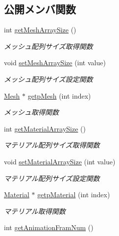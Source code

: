 \subsection*{公開メンバ関数}
\begin{DoxyCompactItemize}
\item 
int \mbox{\hyperlink{class_md_bin_data_a6aa476ad1bb36532609cf344d68a53d8}{get\+Mesh\+Array\+Size}} ()
\begin{DoxyCompactList}\small\item\em メッシュ配列サイズ取得関数 \end{DoxyCompactList}\item 
void \mbox{\hyperlink{class_md_bin_data_aa0e9c2a5db151909fbbf0c3ef41c4e25}{set\+Mesh\+Array\+Size}} (int value)
\begin{DoxyCompactList}\small\item\em メッシュ配列サイズ設定関数 \end{DoxyCompactList}\item 
\mbox{\hyperlink{class_md_bin_data_1_1_mesh}{Mesh}} $\ast$ \mbox{\hyperlink{class_md_bin_data_a8a5dfdabb48917851cea4faa7faf4e35}{getp\+Mesh}} (int index)
\begin{DoxyCompactList}\small\item\em メッシュ取得関数 \end{DoxyCompactList}\item 
int \mbox{\hyperlink{class_md_bin_data_aabed66d8e767c03ad946280048faf226}{get\+Material\+Array\+Size}} ()
\begin{DoxyCompactList}\small\item\em マテリアル配列サイズ取得関数 \end{DoxyCompactList}\item 
void \mbox{\hyperlink{class_md_bin_data_afe92da8866475459da756ecfb92e2683}{set\+Material\+Array\+Size}} (int value)
\begin{DoxyCompactList}\small\item\em マテリアル配列サイズ設定関数 \end{DoxyCompactList}\item 
\mbox{\hyperlink{class_md_bin_data_1_1_material}{Material}} $\ast$ \mbox{\hyperlink{class_md_bin_data_a10bca66286683a1031fc64307866270a}{getp\+Material}} (int index)
\begin{DoxyCompactList}\small\item\em マテリアル取得関数 \end{DoxyCompactList}\item 
int \mbox{\hyperlink{class_md_bin_data_a07857df021c7efa671fb1ed2f764903d}{get\+Animation\+Fram\+Num}} ()

\end{DoxyCompactItemize}
